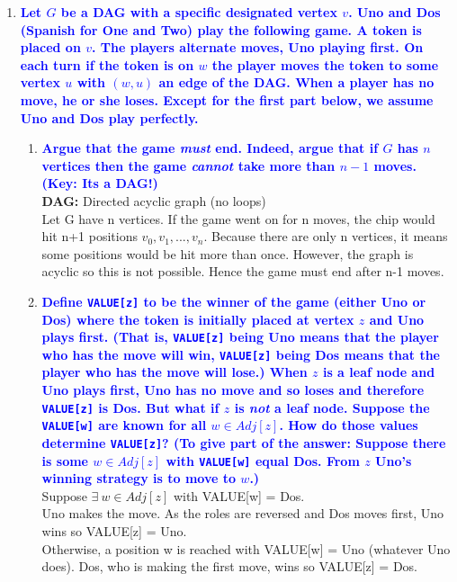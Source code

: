 \documentclass[11pt]{article}
\begin{document}
\begin{enumerate}
\item \textbf{\textcolor{blue}{Let $G$ be a DAG with a specific designated vertex $v$.
Uno and Dos (Spanish for One and Two) play the following game.
A token is placed on $v$.  The players alternate moves, Uno 
playing first.  On each turn if the token is on $w$ the player
moves the token to some vertex $u$ with $(w,u)$ an edge of
the DAG.  When a player has no move, he or she loses.  Except
for the first part below, we assume Uno and Dos play perfectly.}}
\begin{enumerate}
    \item \textbf{\textcolor{blue}{Argue that the game {\em must} end. Indeed, argue that if
    $G$ has $n$ vertices then the game {\em cannot} take more than
    $n-1$ moves. (Key: Its a DAG!)}}
        \\ \textbf{DAG:} Directed acyclic graph (no loops)
        \\ Let G have n vertices. 
        If the game went on for n moves, the chip would hit n+1 positions $v_0, v_1, ..., v_n$.
        Because there are only n vertices, it means some positions would be hit more than once.
        However, the graph is acyclic so this is not possible.
        Hence the game must end after n-1 moves.
        
    \item \textbf{\textcolor{blue}{Define {\tt VALUE[z]} to be the winner of the game
    (either Uno or Dos) where the token is initially placed at vertex $z$ and Uno plays first.  
    (That is, {\tt VALUE[z]} being Uno means that the player who has the move will win,
    {\tt VALUE[z]} being Dos means that the player who has the move will lose.)
    When $z$ is a leaf node and Uno plays first, Uno has no move and so loses and therefore
    {\tt VALUE[z]} is Dos.  But what if $z$ is {\em not} a leaf node.
    Suppose the {\tt VALUE[w]} are known for all $w\in Adj[z]$.  
    How do those values determine {\tt VALUE[z]}?  (To give part of
    the answer: Suppose there is some $w\in Adj[z]$ with {\tt VALUE[w]}
    equal Dos.  From $z$ Uno's winning strategy is to move to $w$.)}}
        \\ Suppose $\exists \ w \in Adj[z]$ with VALUE[w] = Dos.
        \\ Uno makes the move. As the roles are reversed and Dos moves first, Uno wins so VALUE[z] = Uno.
        \\ Otherwise, a position w is reached with VALUE[w] = Uno (whatever Uno does). Dos, who is making the first move, wins so VALUE[z] = Dos.
        

\end{enumerate}
\end{enumerate}
\end{document}
